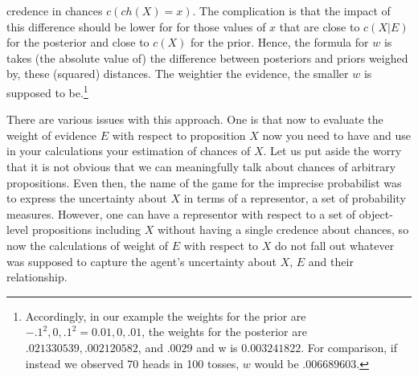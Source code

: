 \documentclass[
  10pt,
  dvipsnames,enabledeprecatedfontcommands]{scrartcl}
\begin{document}
credence in chances \(c(ch(X)=x)\). The complication is that the impact
of this difference should be lower for for those values of \(x\) that
are close to \(c(X\vert E)\) for the posterior and close to \(c(X)\) for
the prior. Hence, the formula for \(w\) is takes (the absolute value of)
the difference between posteriors and priors weighed by, these (squared)
distances. The weightier the evidence, the smaller \(w\) is supposed to
be.\footnote{Accordingly, in our example the weights for the prior are $-.1^2, 0, .1^2 = 0.01, 0, .01$, the weights for the posterior are   $.021330539, .002120582$, and  $.0029$ and w is $0.003241822$. For comparison, if instead we observed 70 heads in 100 tosses, $w$ would be $.006689603$.}

There are various issues with this approach. One is that now to evaluate
the weight of evidence \(E\) with respect to proposition \(X\) now you
need to have and use in your calculations your estimation of chances of
\(X\). Let us put aside the worry that it is not obvious that we can
meaningfully talk about chances of arbitrary propositions. Even then,
the name of the game for the imprecise probabilist was to express the
uncertainty about \(X\) in terms of a representor, a set of probability
measures. However, one can have a representor with respect to a set of
object-level propositions including \(X\) without having a single
credence about chances, so now the calculations of weight of \(E\) with
respect to \(X\) do not fall out whatever was supposed to capture the
agent's uncertainty about \(X\), \(E\) and their relationship.
\end{document}
